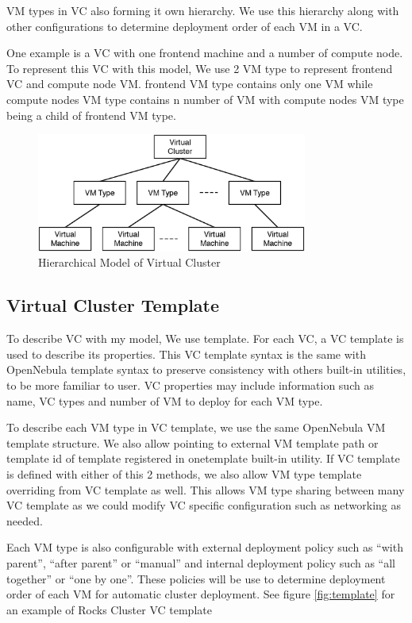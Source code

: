 \documentclass[conference]{IEEEtran}
\begin{document}
VM types in VC also forming it own hierarchy.
We use this hierarchy along with other configurations to determine deployment order of each VM in a VC.

One example is a VC with one frontend machine and a number of compute node.
To represent this VC with this model, We use 2 VM type to represent frontend VC and compute node VM.
frontend VM type contains only one VM while compute nodes VM type contains n number of VM with compute nodes VM type being a child of frontend VM type.

\begin{figure}[!t]
\centering
\includegraphics[width=3.5in]{model}
\caption{Hierarchical Model of Virtual Cluster}
\label{fig:model}
\end{figure}

\subsection{Virtual Cluster Template}
To describe VC with my model, We use template.
For each VC, a VC template is used to describe its properties.
This VC template syntax is the same with OpenNebula template syntax to preserve consistency with others built-in utilities, to be more familiar to user.
VC properties may include information such as name, VC types and number of VM to deploy for each VM type.

To describe each VM type in VC template, we use the same OpenNebula VM template structure.
We also allow pointing to external VM template path or template id of template registered in onetemplate built-in utility.
If VC template is defined with either of this 2 methods, we also allow VM type template overriding from VC template as well.
This allows VM type sharing between many VC template as we could modify VC specific configuration such as networking as needed.

Each VM type is also configurable with external deployment policy such as ``with parent'', ``after parent'' or ``manual'' and internal deployment policy such as ``all together'' or ``one by one''.
These policies will be use to determine deployment order of each VM for automatic cluster deployment.
See figure \ref{fig:template} for an example of Rocks Cluster VC template
\end{document}
